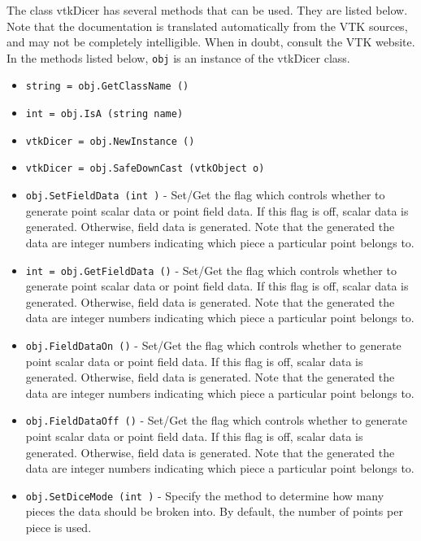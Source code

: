The class vtkDicer has several methods that can be used.
  They are listed below.
Note that the documentation is translated automatically from the VTK sources,
and may not be completely intelligible.  When in doubt, consult the VTK website.
In the methods listed below, \verb|obj| is an instance of the vtkDicer class.
\begin{itemize}
\item  \verb|string = obj.GetClassName ()|

\item  \verb|int = obj.IsA (string name)|

\item  \verb|vtkDicer = obj.NewInstance ()|

\item  \verb|vtkDicer = obj.SafeDownCast (vtkObject o)|

\item  \verb|obj.SetFieldData (int )| -  Set/Get the flag which controls whether to generate point scalar
 data or point field data. If this flag is off, scalar data is
 generated.  Otherwise, field data is generated. Note that the
 generated the data are integer numbers indicating which piece a
 particular point belongs to.

\item  \verb|int = obj.GetFieldData ()| -  Set/Get the flag which controls whether to generate point scalar
 data or point field data. If this flag is off, scalar data is
 generated.  Otherwise, field data is generated. Note that the
 generated the data are integer numbers indicating which piece a
 particular point belongs to.

\item  \verb|obj.FieldDataOn ()| -  Set/Get the flag which controls whether to generate point scalar
 data or point field data. If this flag is off, scalar data is
 generated.  Otherwise, field data is generated. Note that the
 generated the data are integer numbers indicating which piece a
 particular point belongs to.

\item  \verb|obj.FieldDataOff ()| -  Set/Get the flag which controls whether to generate point scalar
 data or point field data. If this flag is off, scalar data is
 generated.  Otherwise, field data is generated. Note that the
 generated the data are integer numbers indicating which piece a
 particular point belongs to.

\item  \verb|obj.SetDiceMode (int )| -  Specify the method to determine how many pieces the data should be
 broken into. By default, the number of points per piece is used.


\end{itemize}
